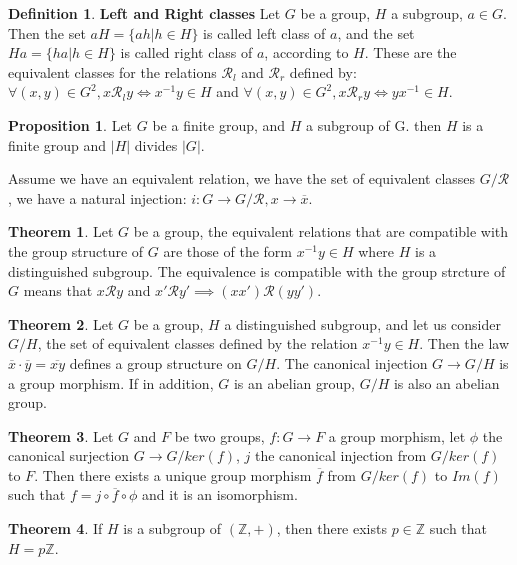 \documentclass{article}
\theoremstyle{definition}
\newtheorem{defi}{Definition}[subsection]
\newtheorem{theorem}{Theorem}[subsection]
\newtheorem{prop}{Proposition}[subsection]
\begin{document}
\begin{defi}
\textbf{Left and Right classes} Let $G$ be a group, $H$ a subgroup, $a\in G$. Then the set $aH=\{ah| h\in H\}$ is called left class of $a$, and the set $Ha=\{ha|h\in H\}$ is called right class of $a$, according to $H$. These are the equivalent classes for the relations $\mathcal{R}_l$ and $\mathcal{R}_r$ defined by: $\forall (x,y)\in G^{2}, x\mathcal{R}_l y \Longleftrightarrow x^{-1}y\in H$ and $\forall (x,y)\in G^{2}, x\mathcal{R}_r y \Longleftrightarrow yx^{-1}\in H$.
\end{defi}

\begin{prop}
Let $G$ be a finite group, and $H$ a subgroup of G. then $H$ is a finite group and $|H|$ divides $|G|$.
\end{prop}

Assume we have an equivalent relation, we have the set of equivalent classes $G/\mathcal{R}$, we have a natural injection: $i: G\to G/\mathcal{R}, x\to \overline{x}$.

\begin{theorem}
Let $G$ be a group, the equivalent relations that are compatible with the group structure of $G$ are those of the form $x^{-1}y\in H$ where $H$ is a distinguished subgroup. The equivalence is compatible with the group strcture of $G$ means that $x\mathcal{R}y$ and $x'\mathcal{R}y'\implies (xx')\mathcal{R}(yy')$.
\end{theorem}

\begin{theorem}
Let $G$ be a group, $H$ a distinguished subgroup, and let us consider $G/H$, the set of equivalent classes defined by the relation $x^{-1}y\in H$. Then the law $\overline{x}\cdot\overline{y}=\overline{xy}$ defines a group structure on $G/H$. The canonical injection $G\to G/H$ is a group morphism. If in addition, $G$ is an abelian group, $G/H$ is also an abelian group.
\end{theorem}

\begin{theorem}
Let $G$ and $F$ be two groups, $f: G\to F$ a group morphism, let $\phi$ the canonical surjection $G\to G/ker(f)$, $j$ the canonical injection from $G/ker(f)$ to $F$. Then there exists a unique group morphism $\overline{f}$ from $G/ker(f)$ to $Im(f)$ such that $f=j\circ \overline{f}\circ \phi$ and it is an isomorphism.
\end{theorem}

\begin{theorem}
If $H$ is a subgroup of $(\mathbb{Z},+)$, then there exists $p\in\mathbb{Z}$ such that $H=p\mathbb{Z}$.
\end{theorem}
\end{document}
